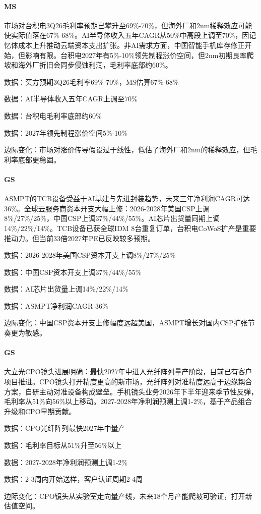 \documentclass[11pt]{ctexart}
\begin{document}
\paragraph{MS} 市场对台积电3Q26毛利率预期已攀升至69\%-70\%，但海外厂和2nm稀释效应可能使实际值落在67\%-68\%。AI半导体收入五年CAGR从50\%中高段上调至70\%，因记忆体成本上升推动云端资本支出扩张。非AI需求方面，中国智能手机库存修正开始，但影响有限。台积电2027年有5\%-10\%领先制程涨价空间，但2nm初期良率爬坡和海外厂折旧会同步侵蚀利润，毛利率底部约60\%。
{\small\color{refgray}数据：买方预期3Q26毛利率69\%-70\%，MS估算67\%-68\%\par}
{\small\color{refgray}数据：AI半导体收入五年CAGR上调至70\%\par}
{\small\color{refgray}数据：台积电毛利率底部约60\%\par}
{\small\color{refgray}数据：2027年领先制程涨价空间5\%-10\%\par}
{\small\color{refgray}边际变化：市场对涨价传导假设过于线性，低估了海外厂和2nm的稀释效应，但毛利率底部更稳固。\par}
\paragraph{GS} ASMPT的TCB设备受益于AI基建与先进封装趋势，未来三年净利润CAGR可达36\%。全球云服务商资本开支大幅上修：2026-2028年美国CSP上调8\%/27\%/25\%，中国CSP上调37\%/44\%/55\%。AI芯片出货量同期上调14\%/22\%/14\%。TCB设备已获全球IDM 8台重复订单，台积电CoWoS扩产是重要推动力。但当前33倍2027年PE已反映较多预期。
{\small\color{refgray}数据：2026-2028年美国CSP资本开支上调8\%/27\%/25\%\par}
{\small\color{refgray}数据：中国CSP资本开支上调37\%/44\%/55\%\par}
{\small\color{refgray}数据：AI芯片出货量上调14\%/22\%/14\%\par}
{\small\color{refgray}数据：ASMPT净利润CAGR 36\%\par}
{\small\color{refgray}边际变化：中国CSP资本开支上修幅度远超美国，ASMPT增长对国内CSP扩张节奏更为敏感。\par}
\paragraph{GS} 大立光CPO镜头进展明确：最快2027年中进入光纤阵列量产阶段，目前已有客户项目推进。CPO镜头打开精度更高的新市场，光纤阵列对准精度远高于边缘耦合方案，自研主动对准设备构成壁垒。手机镜头业务2026年下半年迎来季节性反弹，毛利率从51\%向56\%以上移动。2027-2028年净利润预测上调1-2\%，基于产品组合升级和CPO早期贡献。
{\small\color{refgray}数据：CPO光纤阵列最快2027年中量产\par}
{\small\color{refgray}数据：毛利率目标从51\%升至56\%以上\par}
{\small\color{refgray}数据：2027-2028年净利润预测上调1-2\%\par}
{\small\color{refgray}数据：2-3周内开始送样，客户认证周期2-4周\par}
{\small\color{refgray}边际变化：CPO镜头从实验室走向量产线，未来18个月产能爬坡可验证，打开新估值空间。\par}
\end{document}
